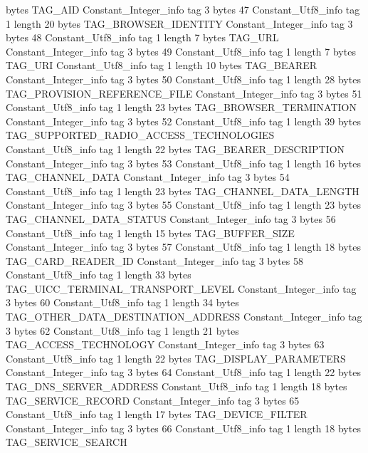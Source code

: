 {{{			bytes	TAG_AID
		}
		Constant_Integer_info {
			tag	3
			bytes	47
		}
		Constant_Utf8_info {
			tag	1
			length	20
			bytes	TAG_BROWSER_IDENTITY
		}
		Constant_Integer_info {
			tag	3
			bytes	48
		}
		Constant_Utf8_info {
			tag	1
			length	7
			bytes	TAG_URL
		}
		Constant_Integer_info {
			tag	3
			bytes	49
		}
		Constant_Utf8_info {
			tag	1
			length	7
			bytes	TAG_URI
		}
		Constant_Utf8_info {
			tag	1
			length	10
			bytes	TAG_BEARER
		}
		Constant_Integer_info {
			tag	3
			bytes	50
		}
		Constant_Utf8_info {
			tag	1
			length	28
			bytes	TAG_PROVISION_REFERENCE_FILE
		}
		Constant_Integer_info {
			tag	3
			bytes	51
		}
		Constant_Utf8_info {
			tag	1
			length	23
			bytes	TAG_BROWSER_TERMINATION
		}
		Constant_Integer_info {
			tag	3
			bytes	52
		}
		Constant_Utf8_info {
			tag	1
			length	39
			bytes	TAG_SUPPORTED_RADIO_ACCESS_TECHNOLOGIES
		}
		Constant_Utf8_info {
			tag	1
			length	22
			bytes	TAG_BEARER_DESCRIPTION
		}
		Constant_Integer_info {
			tag	3
			bytes	53
		}
		Constant_Utf8_info {
			tag	1
			length	16
			bytes	TAG_CHANNEL_DATA
		}
		Constant_Integer_info {
			tag	3
			bytes	54
		}
		Constant_Utf8_info {
			tag	1
			length	23
			bytes	TAG_CHANNEL_DATA_LENGTH
		}
		Constant_Integer_info {
			tag	3
			bytes	55
		}
		Constant_Utf8_info {
			tag	1
			length	23
			bytes	TAG_CHANNEL_DATA_STATUS
		}
		Constant_Integer_info {
			tag	3
			bytes	56
		}
		Constant_Utf8_info {
			tag	1
			length	15
			bytes	TAG_BUFFER_SIZE
		}
		Constant_Integer_info {
			tag	3
			bytes	57
		}
		Constant_Utf8_info {
			tag	1
			length	18
			bytes	TAG_CARD_READER_ID
		}
		Constant_Integer_info {
			tag	3
			bytes	58
		}
		Constant_Utf8_info {
			tag	1
			length	33
			bytes	TAG_UICC_TERMINAL_TRANSPORT_LEVEL
		}
		Constant_Integer_info {
			tag	3
			bytes	60
		}
		Constant_Utf8_info {
			tag	1
			length	34
			bytes	TAG_OTHER_DATA_DESTINATION_ADDRESS
		}
		Constant_Integer_info {
			tag	3
			bytes	62
		}
		Constant_Utf8_info {
			tag	1
			length	21
			bytes	TAG_ACCESS_TECHNOLOGY
		}
		Constant_Integer_info {
			tag	3
			bytes	63
		}
		Constant_Utf8_info {
			tag	1
			length	22
			bytes	TAG_DISPLAY_PARAMETERS
		}
		Constant_Integer_info {
			tag	3
			bytes	64
		}
		Constant_Utf8_info {
			tag	1
			length	22
			bytes	TAG_DNS_SERVER_ADDRESS
		}
		Constant_Utf8_info {
			tag	1
			length	18
			bytes	TAG_SERVICE_RECORD
		}
		Constant_Integer_info {
			tag	3
			bytes	65
		}
		Constant_Utf8_info {
			tag	1
			length	17
			bytes	TAG_DEVICE_FILTER
		}
		Constant_Integer_info {
			tag	3
			bytes	66
		}
		Constant_Utf8_info {
			tag	1
			length	18
			bytes	TAG_SERVICE_SEARCH
}}}
